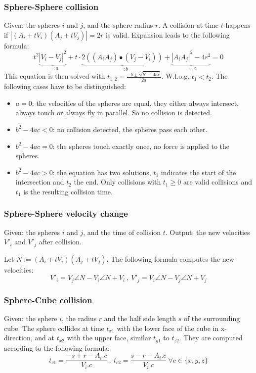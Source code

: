 \documentclass[journal, letterpaper]{IEEEtran}
\begin{document}
\subsubsection{Sphere-Sphere collision}\label{SSC}
Given: the spheres $i$ and $j$, and the sphere radius $r$.
A collision at time $t$ happens if $\left|(A_i + tV_i)(A_j+tV_j)\right|=2r$ is valid. Expansion leads to the following formula:
\begin{equation*}
t^2\underbrace{\left|V_i-V_j\right|^2}_{=:a} + t\cdot\underbrace{2((A_iA_j) \bullet (V_j-V_i))}_{=:b} + \underbrace{\left|A_iA_j\right|^2 - 4r^2}_{=:c} = 0
\label{eq:SSC}
\end{equation*}
This equation is then solved with $t_{1,2}=\frac{-b \pm \sqrt{b^2-4ac}}{2a}$. W.l.o.g. $t_1<t_2$. The following cases have to be distinguished:
\begin{itemize}
	\item $a=0$: the velocities of the spheres are equal, they either always intersect, always touch or always fly in parallel. So no collision is detected.
	\item $b^2-4ac < 0$: no collision detected, the spheres pass each other.
	\item $b^2-4ac = 0$: the spheres touch exactly once, no force is applied to the spheres.
	\item $b^2-4ac > 0$: the equation has two solutions, $t_1$ indicates the start of the intersection and $t_2$ the end. Only collisions with $t_1\geq 0$ are valid collisions and $t_1$ is the resulting collision time.
\end{itemize}

\subsubsection{Sphere-Sphere velocity change}\label{SSV}
Given: the spheres $i$ and $j$, and the time of collision $t$. Output: the new velocities $V'_i$ and $V'_j$ after collision.

Let $N:=(A_i+tV_i)(A_j+tV_j)$. The following formula computes the new velocities:
\begin{equation*}
V'_i=V_j \angle N - V_i \angle N + V_i \ , \ 
V'_j=V_i \angle N - V_j \angle N + V_j
\label{eq:SSV}
\end{equation*}

\subsubsection{Sphere-Cube collision}\label{SCC}
Given: the sphere $i$, the radius $r$ and the half side length $s$ of the surrounding cube. The sphere collides at time $t_{x1}$ with the lower face of the cube in x-direction, and at $t_{x2}$ with the upper face, similar $t_{y1}$ to $t_{z2}$. They are computed according to the following formula:
\begin{equation*}
t_{c1}=\frac{-s+r-A_i.c}{V_i.c} \ , \ t_{c2}=\frac{s-r-A_i.c}{V_i.c} \ \forall c\in \{x,y,z\}
\label{eq:SCC}
\end{equation*}
\end{document}
